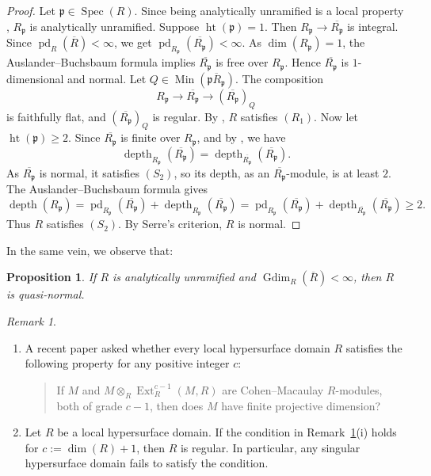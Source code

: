 \documentclass[11.05pt,a4paper]{amsart}
\newtheorem{proposition}[theorem]{Proposition}
\theoremstyle{definition}
\theoremstyle{remark}
\newtheorem{remark}[theorem]{Remark}\newtheorem{fact}[theorem]{Fact}
\newcommand{\Min}{\operatorname{Min}}
\newcommand{\Spec}{\operatorname{Spec}}
\newcommand{\pd}{\operatorname{pd}}
\newcommand{\Gdim}{\operatorname{Gdim}}
\newcommand{\Ext}{\operatorname{Ext}}
\newcommand{\depth}{\operatorname{depth}}
\begin{document}
\begin{proof}
	Let $\mathfrak{p} \in \Spec(R)$. Since being analytically unramified is a local property \cite[Proposition 9.1.4]{HS}, $R_\mathfrak{p}$ is analytically unramified.  
	Suppose $\operatorname{ht}(\mathfrak{p}) = 1$. Then $R_\mathfrak{p} \to \overline{R_\mathfrak{p}}$ is integral. Since $\pd_R(\overline{R}) < \infty$, we get $\pd_{R_\mathfrak{p}}(\overline{R_\mathfrak{p}}) < \infty$. As $\dim (R_\mathfrak{p}) = 1$, the Auslander--Buchsbaum formula implies $\overline{R_\mathfrak{p}}$ is free over $R_\mathfrak{p}$. Hence $\overline{R_\mathfrak{p}}$ is $1$-dimensional and normal.
Let $Q \in \Min(\overline{\mathfrak{p}R_\mathfrak{p}})$. The composition
	\[
	R_\mathfrak{p} \to \overline{R_\mathfrak{p}} \to (\overline{R_\mathfrak{p}})_Q
	\]
	is faithfully flat, and $(\overline{R_\mathfrak{p}})_Q$ is regular. By \cite[Theorem 2.2.12]{BH}, $R$ satisfies $(R_1)$.
Now let $\operatorname{ht}(\mathfrak{p}) \geq 2$. Since $\overline{R_\mathfrak{p}}$ is finite over $R_\mathfrak{p}$, and by \cite[1.2.26(b)]{BH}, we have
	\[
	\depth_{R_\mathfrak{p}}(\overline{R_\mathfrak{p}})
	=
	\depth_{\overline{R_\mathfrak{p}}} (\overline{R_\mathfrak{p}}).
	\]
	As $\overline{R_\mathfrak{p}}$ is normal, it satisfies $(S_2)$, so its depth, as an $\overline{R_\mathfrak{p}}$-module, is at least $2$. The Auslander--Buchsbaum formula gives
	\[
	\depth(R_\mathfrak{p}) 
	= \pd_{R_\mathfrak{p}}(\overline{R_\mathfrak{p}}) + \depth_{R_\mathfrak{p}}(\overline{R_\mathfrak{p}})
	= \pd_{R_\mathfrak{p}}(\overline{R_\mathfrak{p}}) + \depth_{\overline{R_\mathfrak{p}}}(\overline{R_\mathfrak{p}})
	\ge 2.
	\]
	Thus $R$ satisfies $(S_2)$. By Serre's criterion, $R$ is normal.
\end{proof}

In the same vein, we observe that:

\begin{proposition}\label{116q}
	If $R$ is analytically unramified and $\Gdim_R(\overline{R}) < \infty$, then $R$ is quasi-normal.
\end{proposition}

\begin{remark}\label{disc:hypersurface-question}
	\begin{enumerate}
		\item[(i)]	A recent paper \cite{C2} asked whether every local hypersurface domain $R$ satisfies the following property for any positive integer $c$: 
		\begin{quote}
			If $M$ and $M\otimes_R \Ext^{c-1}_R(M,R)$ are Cohen--Macaulay $R$-modules, both of grade $c-1$, then does $M$ have finite projective dimension?
		\end{quote}
		
		\item[(ii)] Let $R$ be a local hypersurface domain. If the condition in Remark~\ref{disc:hypersurface-question}(i) holds for $c := \dim(R)+1$, then $R$ is regular. In particular, any singular hypersurface domain fails to satisfy the condition.
	\end{enumerate}
\end{remark}
\end{document}
